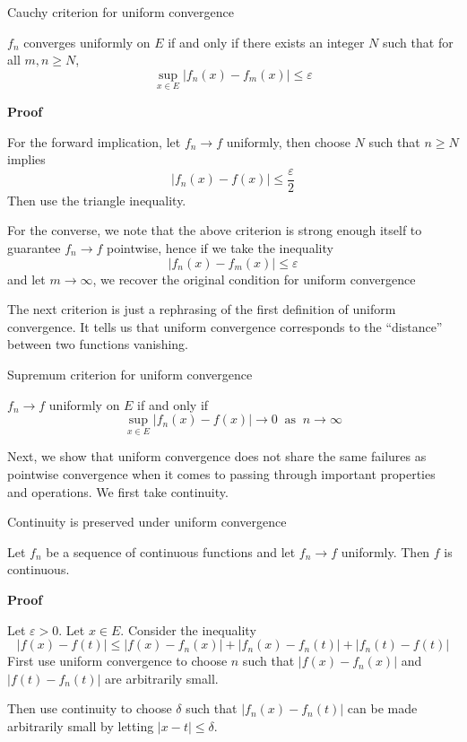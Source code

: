 \begin{theorem}Cauchy criterion for uniform convergence

    $f_n$ converges uniformly on $E$ if and only if there exists an integer $N$ such that for all $m, n \geq N$,
    \[\sup_{x \in E}|f_n(x) - f_m(x)| \leq \varepsilon\]

    \textbf{Proof}

    For the forward implication, let $f_n \rightarrow f$ uniformly, then choose $N$ such that $n \geq N$ implies 
    \[|f_n(x) - f(x)| \leq \frac{\varepsilon}{2}\]
    Then use the triangle inequality.

    For the converse, we note that the above criterion is strong enough itself to guarantee $f_n \rightarrow f$ pointwise, hence if we take the inequality
    \[|f_n(x) - f_m(x)| \leq \varepsilon\]
    and let $m \rightarrow \infty$, we recover the original condition for uniform convergence
\end{theorem}

The next criterion is just a rephrasing of the first definition of uniform convergence. It tells us that uniform convergence corresponds to the ``distance'' between two functions vanishing.

\begin{theorem}Supremum criterion for uniform convergence

    $f_n \rightarrow f$ uniformly on $E$ if and only if 
    \[\sup_{x \in E}|f_n(x) - f(x)| \rightarrow 0 \:\text{ as }\: n \rightarrow \infty\]
\end{theorem}

Next, we show that uniform convergence does not share the same failures as pointwise convergence when it comes to passing through important properties and operations. We first take continuity.

\begin{theorem}Continuity is preserved under uniform convergence

    Let $f_n$ be a sequence of continuous functions and let $f_n \rightarrow f$ uniformly. Then $f$ is continuous.

    \textbf{Proof}

    Let $\varepsilon > 0$. Let $x \in E$. Consider the inequality
    \[|f(x) - f(t)| \leq |f(x) - f_n(x)| + |f_n(x) - f_n(t)| + |f_n(t) - f(t)|\]
First use uniform convergence to choose $n$ such that $|f(x) - f_n(x)|$ and $|f(t) - f_n(t)|$ are arbitrarily small. 

Then use continuity to choose $\delta$ such that $|f_n(x) - f_n(t)|$ can be made arbitrarily small by letting $|x-t| \leq \delta$.
\end{theorem}

